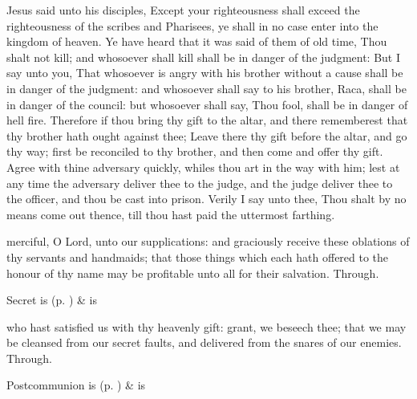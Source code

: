 
 Jesus said unto his disciples, Except your righteousness shall exceed the righteousness of the scribes and Pharisees, ye shall in no case enter into the kingdom of heaven. Ye have heard that it was said of them of old time, Thou shalt not kill; and whosoever shall kill shall be in danger of the judgment: But I say unto you, That whosoever is angry with his brother without a cause shall be in danger of the judgment: and whosoever shall say to his brother, Raca, shall be in danger of the council: but whosoever shall say, Thou fool, shall be in danger of hell fire. Therefore if thou bring thy gift to the altar, and there rememberest that thy brother hath ought against thee; Leave there thy gift before the altar, and go thy way; first be reconciled to thy brother, and then come and offer thy gift. Agree with thine adversary quickly, whiles thou art in the way with him; lest at any time the adversary deliver thee to the judge, and the judge deliver thee to the officer, and thou be cast into prison. Verily I say unto thee, Thou shalt by no means come out thence, till thou hast paid the uttermost farthing.


\secret
{} merciful, O Lord, unto our supplications: and graciously receive these oblations of thy servants and handmaids; that those things which each hath offered to the honour of thy name may be profitable unto all for their salvation. Through.
\begin{rubric}
     Secret is  (p. \pageref{SPSaints}) \&  is 
\end{rubric}


\postcommunion
{} who hast satisfied us with thy heavenly gift: grant, we beseech thee; that we may be cleansed from our secret faults, and delivered from the snares of our enemies. Through.
\begin{rubric}
     Postcommunion is  (p. \pageref{SPSaints}) \&  is 
\end{rubric}


